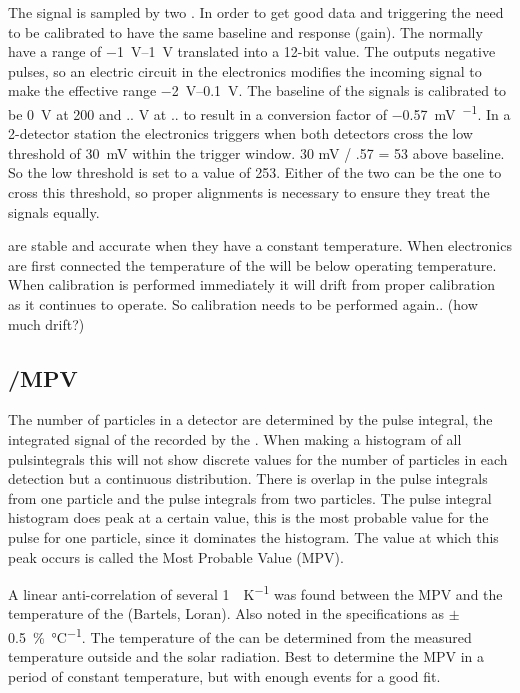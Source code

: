 The signal is sampled by two \adcs. In order to get good data and
triggering the \adcs need to be calibrated to have the same baseline and
response (gain). The \adcs normally have a range of
\SIrange{-1}{1}{\volt} translated into a 12-bit value. The \pmt outputs
negative pulses, so an electric circuit in the \hisparc electronics
modifies the incoming signal to make the effective \adc range
\SIrange{-2}{0.1}{\volt}. The baseline of the signals is calibrated to
be \SI{0}{\volt} at \SI{200}{\adc} and .. V at .. \Adcs to result in a
conversion factor of \SI{-0.57}{\milli\volt\per\adc}. In a 2-detector
station the \hisparc electronics triggers when both detectors cross the
low threshold of \SI{30}{\milli\volt} within the trigger window. 30 mV /
.57 = 53 above baseline. So the low threshold is set to a value of
\SI{253}{\adc}. Either of the two \adcs can be the one to cross this
threshold, so proper \adc alignments is necessary to ensure they treat
the signals equally.

\adcs are stable and accurate when they have a constant temperature.
When \hisparc electronics are first connected the temperature of the
\adcs will be below operating temperature. When calibration is performed
immediately it will drift from proper calibration as it continues to
operate. So calibration needs to be performed again.. (how much drift?)


\subsection{\mip/MPV}

The number of particles in a detector are determined by the pulse
integral, the integrated signal of the \pmt recorded by the \adc. When
making a histogram of all pulsintegrals this will not show discrete
values for the number of particles in each detection but a continuous
distribution. There is overlap in the pulse integrals from one particle
and the pulse integrals from two particles. The pulse integral histogram
does peak at a certain value, this is the most probable value for the
pulse for one particle, since it dominates the histogram. The value at
which this peak occurs is called the Most Probable Value (MPV).

A linear anti-correlation of several \SI{1}{\adc\per\kelvin} was found
between the MPV and the temperature of the \pmt (Bartels, Loran). Also
noted in the specifications as $\pm$
\SI{.5}{\percent\per\degreeCelsius}. The temperature of the \pmt can be
determined from the measured temperature outside and the solar
radiation. Best to determine the MPV in a period of constant
temperature, but with enough events for a good fit.



